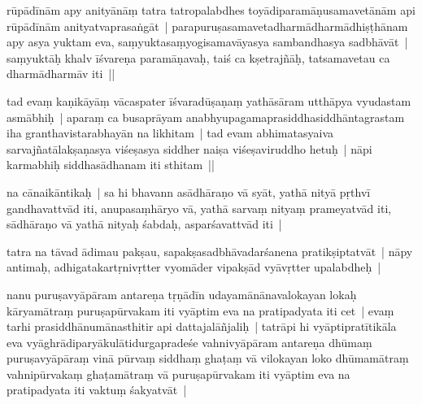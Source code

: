 \documentclass[article,12pt,a4paper]{memoir}%
\newcounter{parCount}
\begin{document}
rūpādīnām apy anityānāṃ tatra tatropalabdhes toyādiparamāṇusamavetānām api rūpādīnām anityatvaprasaṅgāt | parapuruṣasamavetadharmādharmādhiṣṭhānam apy asya yuktam eva, saṃyuktasaṃyogisamavāyasya sambandhasya sadbhāvāt | saṃyuktāḥ khalv īśvareṇa paramāṇavaḥ, taiś ca kṣetrajñāḥ, tatsamavetau ca dharmādharmāv iti ||
	{}
	\pend%
      

	  \pstart \leavevmode%
	\label{thakur75-36.17}tad evaṃ kaṇikāyāṃ vācaspater īśvaradūṣaṇaṃ yathāsāram utthāpya vyudastam asmābhiḥ | aparaṃ ca busaprāyam anabhyupagamaprasiddhasiddhāntagrastam iha granthavistarabhayān na likhitam | tad evam abhimatasyaiva sarvajñatālakṣaṇasya viśeṣasya siddher naiṣa viśeṣaviruddho hetuḥ | nāpi karmabhiḥ siddhasādhanam iti sthitam || 
	{}
	\pend%
      

	  \pstart \leavevmode%
	\label{thakur75-36.21} na cānaikāntikaḥ | sa hi bhavann asādhāraṇo vā syāt, yathā nityā pṛthvī gandhavattvād iti, anupasaṃhāryo vā, yathā sarvaṃ nityaṃ prameyatvād iti, sādhāraṇo vā yathā nityaḥ śabdaḥ, asparśavattvād iti |
	{}
	\pend%
      

	  \pstart \leavevmode%
	\label{thakur75-36.24}tatra na tāvad ādimau pakṣau, sapakṣasadbhāvadarśanena pratikṣiptatvāt | nāpy antimaḥ, adhigatakartṛnivṛtter vyomāder vipakṣād vyāvṛtter upalabdheḥ | 
	{}
	\pend%
      

	  \pstart \leavevmode%
	\label{thakur75-36.26}nanu puruṣavyāpāram antareṇa tṛṇādīn udayamānānavalokayan lokaḥ kāryamātraṃ puruṣapūrvakam iti vyāptim eva na pratipadyata iti cet | evaṃ tarhi prasiddhānumānasthitir api dattajalāñjaliḥ | tatrāpi hi vyāptipratītikāla eva vyāghrā\leavevmode{}\label{RNAms_21a}diparyākulātidurgapradeśe vahnivyāpāram antareṇa dhūmaṃ puruṣavyāpāraṃ vinā pūrvaṃ siddhaṃ ghaṭaṃ vā vilokayan loko dhūmamātraṃ vahnipūrvakaṃ ghaṭamātraṃ vā puruṣapūrvakam iti vyāptim eva na pratipadyata iti vaktuṃ śakyatvāt |
	{}
	\pend%
      
\end{document}
